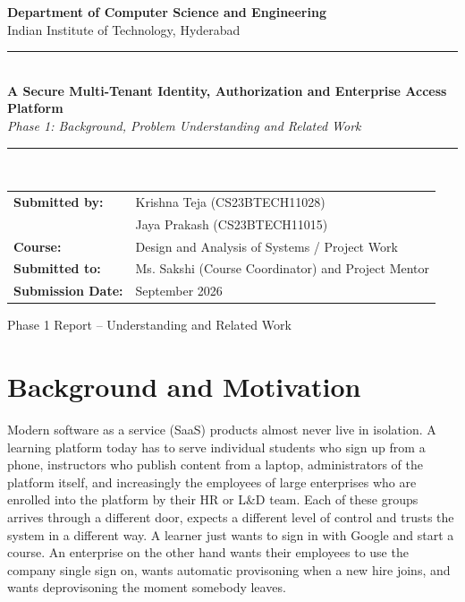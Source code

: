 \documentclass[11pt,a4paper]{article}
\begin{document}
\begin{titlepage}
    \centering
    \vspace*{1.5cm}

    {\Large \textbf{Department of Computer Science and Engineering}}\\[0.4cm]
    {\large Indian Institute of Technology, Hyderabad}\\[2.5cm]

    \rule{\linewidth}{0.5pt}\\[0.6cm]
    {\huge \textbf{A Secure Multi-Tenant Identity, Authorization and Enterprise Access Platform}}\\[0.4cm]
    {\Large \textit{Phase 1: Background, Problem Understanding and Related Work}}\\[0.3cm]
    \rule{\linewidth}{0.5pt}\\[2cm]

    \begin{tabular}{ll}
    \textbf{Submitted by:} & Krishna Teja (CS23BTECH11028) \\
                           & Jaya Prakash (CS23BTECH11015) \\[0.5cm]
    \textbf{Course:} & Design and Analysis of Systems / Project Work \\[0.5cm]
    \textbf{Submitted to:} & Ms. Sakshi (Course Coordinator) and Project Mentor \\[0.5cm]
    \textbf{Submission Date:} & September 2026 \\
    \end{tabular}

    \vfill
    {\large Phase 1 Report -- Understanding and Related Work}
\end{titlepage}

\tableofcontents
\newpage

\section{Background and Motivation}

Modern software as a service (SaaS) products almost never live in isolation. A learning platform today has to serve individual students who sign up from a phone, instructors who publish content from a laptop, administrators of the platform itself, and increasingly the employees of large enterprises who are enrolled into the platform by their HR or L\&D team. Each of these groups arrives through a different door, expects a different level of control and trusts the system in a different way. A learner just wants to sign in with Google and start a course. An enterprise on the other hand wants their employees to use the company single sign on, wants automatic provisoning when a new hire joins, and wants deprovisoning the moment somebody leaves.
\end{document}
